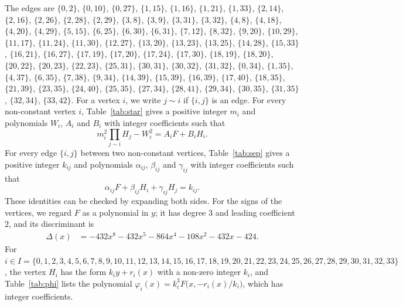 \documentclass[11pt]{article}
\begin{document}
The edges are $\{0,2\}$, $\{0,10\}$, $\{0,27\}$, $\{1,15\}$, $\{1,16\}$, $\{1,21\}$, $\{1,33\}$, $\{2,14\}$, $\{2,16\}$, $\{2,26\}$, $\{2,28\}$, $\{2,29\}$, $\{3,8\}$, $\{3,9\}$, $\{3,31\}$, $\{3,32\}$, $\{4,8\}$, $\{4,18\}$, $\{4,20\}$, $\{4,29\}$, $\{5,15\}$, $\{6,25\}$, $\{6,30\}$, $\{6,31\}$, $\{7,12\}$, $\{8,32\}$, $\{9,20\}$, $\{10,29\}$, $\{11,17\}$, $\{11,24\}$, $\{11,30\}$, $\{12,27\}$, $\{13,20\}$, $\{13,23\}$, $\{13,25\}$, $\{14,28\}$, $\{15,33\}$, $\{16,21\}$, $\{16,27\}$, $\{17,19\}$, $\{17,20\}$, $\{17,24\}$, $\{17,30\}$, $\{18,19\}$, $\{18,20\}$, $\{20,22\}$, $\{20,23\}$, $\{22,23\}$, $\{25,31\}$, $\{30,31\}$, $\{30,32\}$, $\{31,32\}$, $\{0,34\}$, $\{1,35\}$, $\{4,37\}$, $\{6,35\}$, $\{7,38\}$, $\{9,34\}$, $\{14,39\}$, $\{15,39\}$, $\{16,39\}$, $\{17,40\}$, $\{18,35\}$, $\{21,39\}$, $\{23,35\}$, $\{24,40\}$, $\{25,35\}$, $\{27,34\}$, $\{28,41\}$, $\{29,34\}$, $\{30,35\}$, $\{31,35\}$, $\{32,34\}$, $\{33,42\}$. For a vertex $i$, we write $j\sim i$ if $\{i,j\}$ is an edge.
For every non-constant vertex $i$, Table~\ref{tab:star} gives a positive integer $m_{i}$ and polynomials $W_{i}$, $A_{i}$ and $B_{i}$ with integer coefficients such that
\begin{equation}\label{eq:star}
m_i^2\prod_{j\sim i}H_j-W_i^2=A_iF+B_iH_i.
\end{equation}
For every edge $\{i,j\}$ between two non-constant vertices, Table~\ref{tab:sep} gives a positive integer $k_{ij}$ and polynomials $\alpha_{ij}$, $\beta_{ij}$ and $\gamma_{ij}$ with integer coefficients such that
\begin{equation}\label{eq:sep}
\alpha_{ij}F+\beta_{ij}H_i+\gamma_{ij}H_j=k_{ij}.
\end{equation}
These identities can be checked by expanding both sides.
For the signs of the vertices, we regard $F$ as a polynomial in $y$; it has degree $3$ and leading coefficient $2$, and its discriminant is
\begin{align*}
\Delta(x)&=-432x^{8}-432x^{5}-864x^{4}-108x^{2}-432x-424.
\end{align*}
For $i\in I=\{0,\allowbreak 1,\allowbreak 2,\allowbreak 3,\allowbreak 4,\allowbreak 5,\allowbreak 6,\allowbreak 7,\allowbreak 8,\allowbreak 9,\allowbreak 10,\allowbreak 11,\allowbreak 12,\allowbreak 13,\allowbreak 14,\allowbreak 15,\allowbreak 16,\allowbreak 17,\allowbreak 18,\allowbreak 19,\allowbreak 20,\allowbreak 21,\allowbreak 22,\allowbreak 23,\allowbreak 24,\allowbreak 25,\allowbreak 26,\allowbreak 27,\allowbreak 28,\allowbreak 29,\allowbreak 30,\allowbreak 31,\allowbreak 32,\allowbreak 33\}$, the vertex $H_i$ has the form $k_iy+r_i(x)$ with a non-zero integer $k_i$, and Table~\ref{tab:phi} lists the polynomial $\varphi_i(x)=k_i^3F\bigl(x,-r_i(x)/k_i\bigr)$, which has integer coefficients.
\end{document}
